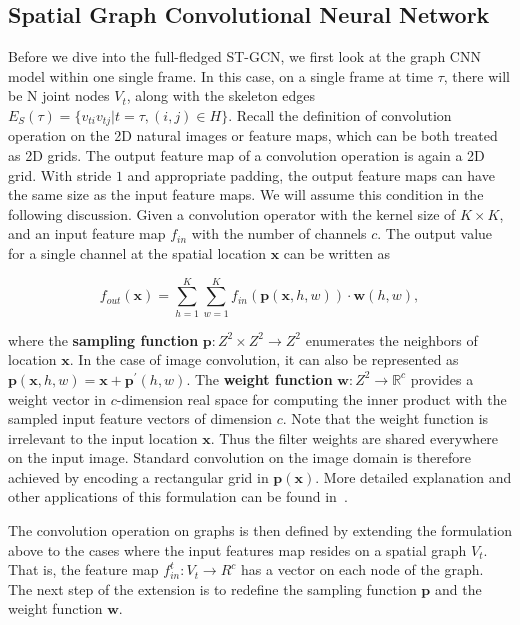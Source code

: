 \documentclass[letterpaper]{article} %
\begin{document}
\subsection{Spatial Graph Convolutional Neural Network}
Before we dive into the full-fledged ST-GCN, we first look at the graph CNN model within one single frame.
In this case, on a single frame at time $ \tau $, there will be N joint nodes $ V_t $, along with the skeleton edges $ E_S(\tau) = \{v_{ti}v_{tj}| t= \tau, (i, j) \in H\} $.
Recall the definition of convolution operation on the 2D natural images or feature maps, which can be both treated as 2D grids.
The output feature map of a convolution operation is again a 2D grid.
With stride $ 1 $ and appropriate padding, the output feature maps can have the same size as the input feature maps. 
We will assume this condition in the following discussion.
Given a convolution operator with the kernel size of $ K\times K $, and an input feature map $ f_{in} $ with the number of channels $ c $.
The output value for a single channel at the spatial location $ \mathbf{x} $ can be written as 

\begin{equation}\label{eq:gen_conv}
f_{out}(\mathbf{x}) = \sum_{h=1}^{K} \sum_{w=1}^{K} f_{in}(\mathbf{p}(\mathbf{x}, h, w))\cdot \mathbf{w}(h, w), 	
\end{equation}

where the \textbf{sampling function} $ \mathbf{p}: Z^2\times Z^2\rightarrow Z^2 $ enumerates the neighbors of location $ \mathbf{x} $.
In the case of image convolution, it can also be represented as $ \mathbf{p}(\mathbf{x}, h, w) = \mathbf{x} + \mathbf{p^\prime}(h, w). $ 
The \textbf{weight function} $ \mathbf{w}: Z^2\rightarrow \mathbb{R}^c$ provides a weight vector in $ c $-dimension real space for computing the inner product with the sampled input feature vectors of dimension $ c $.
Note that the weight function is irrelevant to the input location $ \mathbf{x} $.
Thus the filter weights are shared everywhere on the input image.
Standard convolution on the image domain is therefore achieved by encoding a rectangular grid in $ \mathbf{p}(\mathbf{x}) $.
More detailed explanation and other applications of this formulation can be found in~\cite{Dai2017Arxiv}.

The convolution operation on graphs is then defined by extending the formulation above to the cases where the input features map resides on a spatial graph $ V_t $.
That is, the feature map $ f_{in}^t : V_t\rightarrow R^c$ has a vector on each node of the graph.
The next step of the extension is to redefine the sampling function $ \mathbf{p} $ and the weight function $ \mathbf{w} $.
\end{document}
